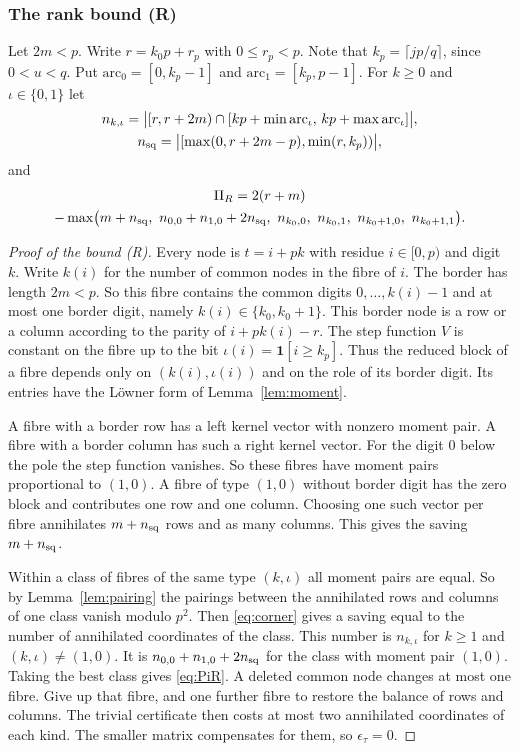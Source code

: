 \documentclass[11pt]{amsart}
\theoremstyle{definition}
\theoremstyle{remark}
\numberwithin{equation}{section}
\begin{document}
\subsubsection{The rank bound (R)}\label{sssec:rank}
Let $2m<p$. Write $r=k_0p+r_p$ with $0\le r_p<p$. Note that $k_p=\lceil jp/q\rceil$, since $0<u<q$. Put
$\mathrm{arc}_0=[0,k_p-1]$ and $\mathrm{arc}_1=[k_p,p-1]$. For $k\ge0$ and $\iota\in\{0,1\}$ let
\[
\begin{gathered}
 n_{k,\iota}=\bigl|[r,r+2m)\cap[kp+\min\mathrm{arc}_\iota,\,kp+\max\mathrm{arc}_\iota]\bigr|,\\
 n_{\rm sq}=\bigl|[\max(0,r+2m-p),\min(r,k_p))\bigr|,
\end{gathered}
\]
and
\begin{multline}\label{eq:PiR}
 \Pi_R=2(r+m)\\-\max\bigl(m+n_{\rm sq},\ n_{0,0}+n_{1,0}+2n_{\rm sq},\ n_{k_0,0},\ n_{k_0,1},\ n_{k_0+1,0},\ n_{k_0+1,1}\bigr).
\end{multline}

\begin{proof}[Proof of the bound (R)]
Every node is $t=i+pk$ with residue $i\in[0,p)$ and digit $k$. Write $k(i)$ for the number of common nodes in the fibre
of $i$. The border has length $2m<p$. So this fibre contains the common digits $0,\dots,k(i)-1$ and at most one border
digit, namely $k(i)\in\{k_0,k_0+1\}$. This border node is a row or a column according to the parity of $i+pk(i)-r$. The
step function $V$ is constant on the fibre up to the bit $\iota(i)=\mathbf 1[i\ge k_p]$. Thus the reduced block of a fibre
depends only on $(k(i),\iota(i))$ and on the role of its border digit. Its entries have the L\"owner form of
Lemma~\ref{lem:moment}.

A fibre with a border row has a left kernel vector with nonzero moment pair. A fibre with a border column has such a
right kernel vector. For the digit $0$ below the pole the step function vanishes. So these fibres have moment pairs
proportional to $(1,0)$. A fibre of type $(1,0)$ without border digit has the zero block and contributes one row and one
column. Choosing one such vector per fibre annihilates $m+n_{\rm sq}$ rows and as many columns. This gives the saving
$m+n_{\rm sq}$.

Within a class of fibres of the same type $(k,\iota)$ all moment pairs are equal. So by Lemma~\ref{lem:pairing} the
pairings between the annihilated rows and columns of one class vanish modulo $p^2$. Then \eqref{eq:corner} gives a saving
equal to the number of annihilated coordinates of the class. This number is $n_{k,\iota}$ for $k\ge1$ and
$(k,\iota)\ne(1,0)$. It is $n_{0,0}+n_{1,0}+2n_{\rm sq}$ for the class with moment pair $(1,0)$. Taking the best class gives
\eqref{eq:PiR}. A deleted common node changes at most one fibre. Give up that fibre, and one further fibre to restore the
balance of rows and columns. The trivial certificate then costs at most two annihilated coordinates of each kind. The smaller
matrix compensates for them, so $\epsilon_\tau=0$.
\end{proof}
\end{document}
